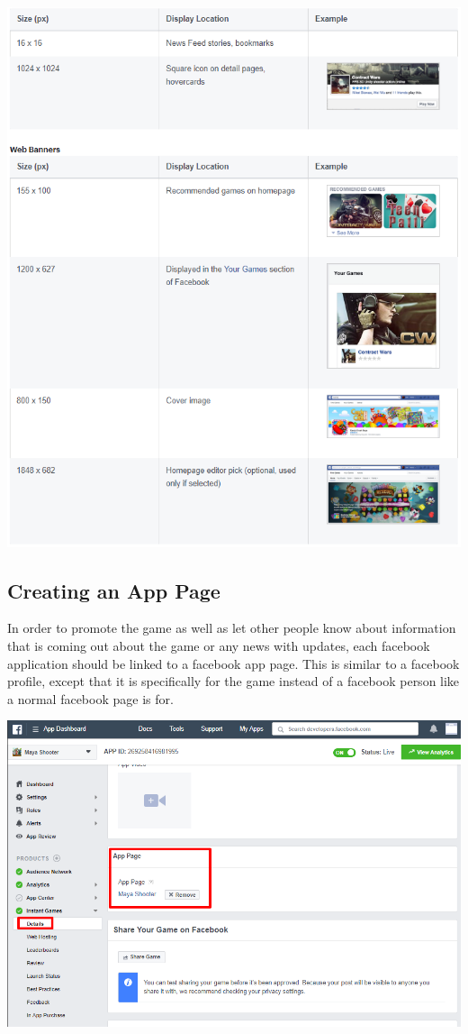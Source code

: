 \documentclass{article}
\begin{document}
\begin{center}
\includegraphics[width=\textwidth]{images/picturesexplained.png}
\end{center}

\subsection{Creating an App Page}
In order to promote the game as well as let other people know about information that is coming out about the game or any news with updates, each facebook application should be linked to a facebook app page. This is similar to a facebook profile, except that it is specifically for the game instead of a facebook person like a normal facebook page is for.

\begin{center}
\includegraphics[width=\textwidth]{images/apppage.png}
\end{center}
\end{document}
